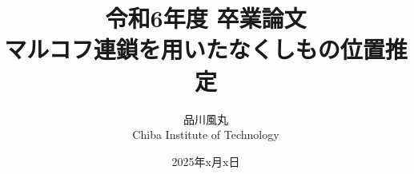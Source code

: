 \documentclass[a4paper,11pt]{jsbook}
\begin{document}
\title{令和6年度 卒業論文\\
マルコフ連鎖を用いたなくしもの位置推定}

\author{品川風丸 \\
Chiba Institute of Technology}

\date{2025年x月x日}

\maketitle

\clearpage




\tableofcontents



\cleardoublepage
{}


% 



\appendix





\newpage
\printindex
\end{document}

